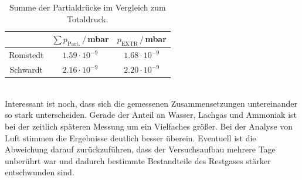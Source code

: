 \documentclass[german, parskip=full]{scrartcl}
\newcommand{\tecxt}{}
\begin{document}
\begin{table}[h!]
\centering
\begin{tabular}{c|c|c}
&$\sum p_\tecxt\text{Part.}\,/\,$mbar&$p_\tecxt\text{EXTR}\,/\,$mbar\\ \hline
Romstedt&$1.59\cdot 10^{-9}$&$1.68\cdot 10^{-9}$\\ \hline
Schwardt&$2.16\cdot 10^{-9}$&$2.20\cdot 10^{-9}$\\
\end{tabular}
\caption{Summe der Partialdrücke im Vergleich zum Totaldruck.}
\label{table:DaltonRestgas}
\end{table}\\
Interessant ist noch, dass sich die gemessenen Zusammensetzungen untereinander so stark unterscheiden. Gerade der Anteil an Wasser, Lachgas und Ammoniak ist bei der zeitlich späteren Messung um ein Vielfaches größer. Bei der Analyse von Luft stimmen die Ergebnisse deutlich besser überein. Eventuell ist die Abweichung darauf zurückzuführen, dass der Versuchsaufbau mehrere Tage unberührt war und dadurch bestimmte Bestandteile des Restgases stärker entschwunden sind.\newpage
\end{document}
